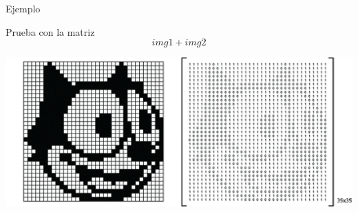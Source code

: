 \begin{frame}{Ejemplo}
    
    \vspace{0.5cm}
    Prueba con la matriz
    \[
        img1 + img2
    \]
    \vfill

\end{frame}

\begin{frame}

    \hspace*{-.5cm}
    \includegraphics[width=15cm]{Figuras/Fig07}

\end{frame}